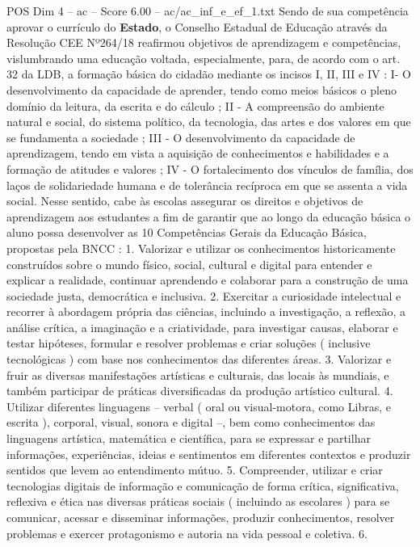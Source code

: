 \begin{textsample}{POS Dim 4 – ac – Score 6.00 – ac/ac\_inf\_e\_ef\_1.txt}
Sendo de sua competência aprovar o currículo do \textbf{Estado}, o Conselho Estadual de Educação através da Resolução CEE Nº264/18 reafirmou objetivos de aprendizagem e competências, vislumbrando uma educação voltada, especialmente, para, de acordo com o art. 32 da LDB, a formação básica do cidadão mediante os incisos I, II, III e IV : I- O desenvolvimento da capacidade de aprender, tendo como meios básicos o pleno domínio da leitura, da escrita e do cálculo ; II - A compreensão do ambiente natural e social, do sistema político, da tecnologia, das artes e dos valores em que se fundamenta a sociedade ; III - O desenvolvimento da capacidade de aprendizagem, tendo em vista a aquisição de conhecimentos e habilidades e a formação de atitudes e valores ; IV - O fortalecimento dos vínculos de família, dos laços de solidariedade humana e de tolerância recíproca em que se assenta a vida social.
Nesse sentido, cabe às escolas assegurar os direitos e objetivos de aprendizagem aos estudantes a fim de garantir que ao longo da educação básica o aluno possa desenvolver as 10 Competências Gerais da Educação Básica, propostas pela BNCC : 1.
Valorizar e utilizar os conhecimentos historicamente construídos sobre o mundo físico, social, cultural e digital para entender e explicar a realidade, continuar aprendendo e colaborar para a construção de uma sociedade justa, democrática e inclusiva. 2.
Exercitar a curiosidade intelectual e recorrer à abordagem própria das ciências, incluindo a investigação, a reflexão, a análise crítica, a imaginação e a criatividade, para investigar causas, elaborar e testar hipóteses, formular e resolver problemas e criar soluções ( inclusive tecnológicas ) com base nos conhecimentos das diferentes áreas. 3.
Valorizar e fruir as diversas manifestações artísticas e culturais, das locais às mundiais, e também participar de práticas diversificadas da produção artístico cultural. 4.
Utilizar diferentes linguagens – verbal ( oral ou visual-motora, como Libras, e escrita ), corporal, visual, sonora e digital –, bem como conhecimentos das linguagens artística, matemática e científica, para se expressar e partilhar informações, experiências, ideias e sentimentos em diferentes contextos e produzir sentidos que levem ao entendimento mútuo. 5.
Compreender, utilizar e criar tecnologias digitais de informação e comunicação de forma crítica, significativa, reflexiva e ética nas diversas práticas sociais ( incluindo as escolares ) para se comunicar, acessar e disseminar informações, produzir conhecimentos, resolver problemas e exercer protagonismo e autoria na vida pessoal e coletiva. 6.

\end{textsample}

